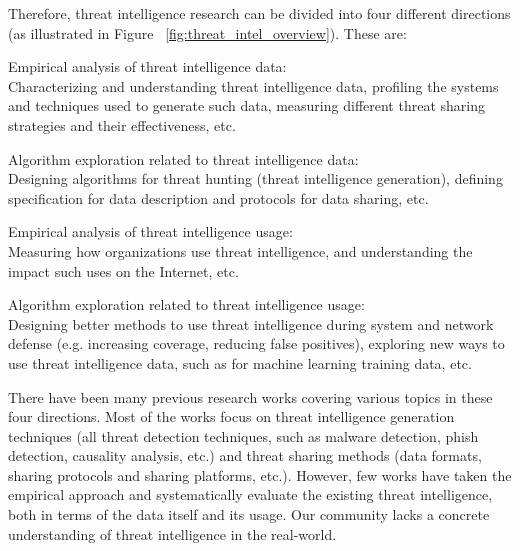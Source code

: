 Therefore, threat intelligence research can be divided into four 
different directions (as illustrated in Figure
~\ref{fig:threat_intel_overview}). These are:
\begin{prettylist}
    \item Empirical analysis of threat intelligence data: \\
    Characterizing and understanding threat intelligence data, profiling the 
    systems and techniques used to generate such data, measuring different 
    threat sharing strategies and their effectiveness, etc.
    
    \item Algorithm exploration related to threat intelligence data: \\
    Designing algorithms for threat hunting (threat intelligence generation),
    defining specification for data description and protocols for data 
    sharing, etc.
    
    \item Empirical analysis of threat intelligence usage: \\
    Measuring how organizations use threat intelligence, and understanding
    the impact such uses on the Internet, etc.
    
    \item Algorithm exploration related to threat intelligence usage: \\
    Designing better methods to use threat intelligence during system and 
    network defense (e.g. increasing coverage, reducing false positives),
    exploring new ways to use threat intelligence data, such as for machine
    learning training data, etc.
\end{prettylist}

There have been many previous research works covering various topics in these
four directions. Most of the works focus on threat intelligence generation
techniques (all threat detection techniques, such as malware detection, phish 
detection, causality analysis, etc.) and threat sharing methods (data formats, 
sharing protocols and sharing platforms, etc.). However, few works have taken
the empirical approach and systematically evaluate the existing threat
intelligence, both in terms of the data itself and its usage. Our community 
lacks a concrete understanding of threat intelligence in the real-world.

